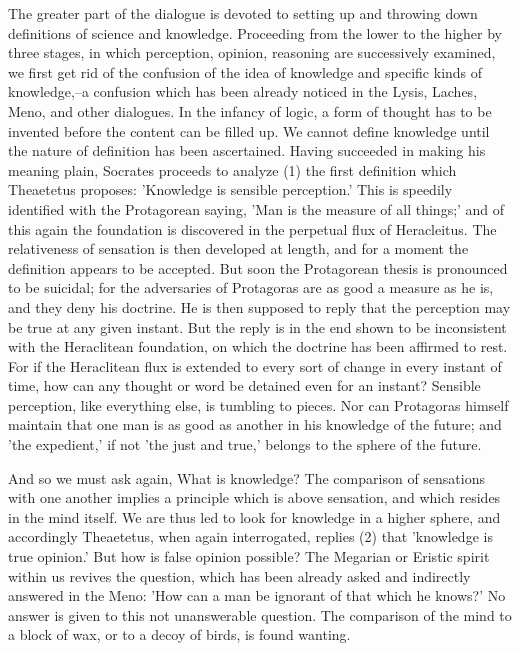 The greater part of the dialogue is devoted to setting up and throwing
down definitions of science and knowledge. Proceeding from the lower to
the higher by three stages, in which perception, opinion, reasoning are
successively examined, we first get rid of the confusion of the idea of
knowledge and specific kinds of knowledge,--a confusion which has been
already noticed in the Lysis, Laches, Meno, and other dialogues. In
the infancy of logic, a form of thought has to be invented before the
content can be filled up. We cannot define knowledge until the nature of
definition has been ascertained. Having succeeded in making his meaning
plain, Socrates proceeds to analyze (1) the first definition which
Theaetetus proposes: 'Knowledge is sensible perception.' This is
speedily identified with the Protagorean saying, 'Man is the measure
of all things;' and of this again the foundation is discovered in the
perpetual flux of Heracleitus. The relativeness of sensation is then
developed at length, and for a moment the definition appears to be
accepted. But soon the Protagorean thesis is pronounced to be suicidal;
for the adversaries of Protagoras are as good a measure as he is, and
they deny his doctrine. He is then supposed to reply that the perception
may be true at any given instant. But the reply is in the end shown to
be inconsistent with the Heraclitean foundation, on which the doctrine
has been affirmed to rest. For if the Heraclitean flux is extended to
every sort of change in every instant of time, how can any thought
or word be detained even for an instant? Sensible perception, like
everything else, is tumbling to pieces. Nor can Protagoras himself
maintain that one man is as good as another in his knowledge of the
future; and 'the expedient,' if not 'the just and true,' belongs to the
sphere of the future.

And so we must ask again, What is knowledge? The comparison of
sensations with one another implies a principle which is above
sensation, and which resides in the mind itself. We are thus led to look
for knowledge in a higher sphere, and accordingly Theaetetus, when again
interrogated, replies (2) that 'knowledge is true opinion.' But how is
false opinion possible? The Megarian or Eristic spirit within us revives
the question, which has been already asked and indirectly answered in
the Meno: 'How can a man be ignorant of that which he knows?' No answer
is given to this not unanswerable question. The comparison of the mind
to a block of wax, or to a decoy of birds, is found wanting.

